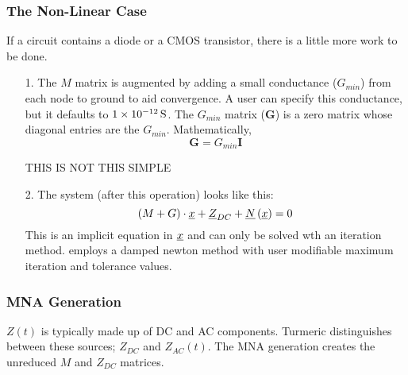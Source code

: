 \subsubsection{The Non-Linear Case}
If a circuit contains a diode or a CMOS transistor, there is a little more work to be done.\\

\begin{enumerate}
    \item[1.] The $M$ matrix is augmented by adding a small conductance ($G_{min}$) from each node to ground to aid convergence. A user can specify this conductance, but it defaults to $\SI{1d-12}{\siemens}$. The $G_{min}$ matrix ($\mathbf{G}$) is a zero matrix whose diagonal entries are the $G_{min}$. Mathematically, \[ \mathbf{G} = G_{min}\mathbf{I}\]
    
    THIS IS NOT THIS SIMPLE
    \item[2.] The system (after this operation) looks like this: \[ \left(M + G \right)\cdot \underline{x} + \underline{Z}_{DC} +  \underline{N}\left(\underline{x} \right) = 0\]
    This is an implicit equation in $\underline{x}$ and can only be solved wth an iteration method. \turmeric employs a damped newton method with user modifiable maximum iteration and tolerance values. 
\end{enumerate}




\subsubsection{MNA Generation}
$Z\left( t\right)$ is typically made up of DC and AC components. Turmeric distinguishes between these sources; $Z_{DC}$ and $Z_{AC}\left( t\right)$. The MNA generation creates the unreduced $M$ and $Z_{DC}$ matrices.